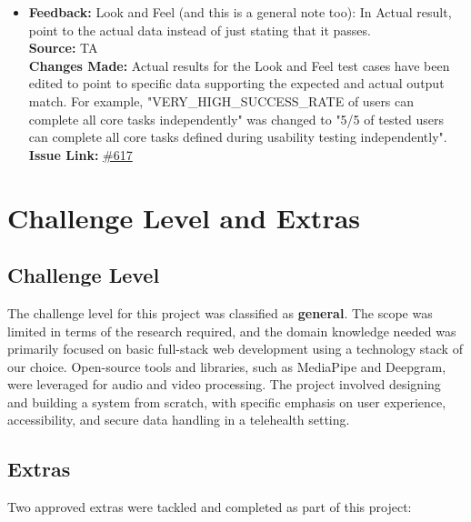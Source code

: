 \documentclass{article}
\begin{document}
\begin{itemize}
  \item 
    \textbf{Feedback:} Look and Feel (and this is a general note too): In Actual result, point to the actual data instead of just stating that it passes. \\
    \textbf{Source:} TA \\
    \textbf{Changes Made:} Actual results for the Look and Feel test cases have been edited to point to specific data supporting the expected and actual output match. For example, "VERY\_HIGH\_SUCCESS\_RATE of users can complete all core tasks independently" was changed to "5/5 of tested users can complete all core tasks defined during usability testing independently".\\
    \textbf{Issue Link:} \href{https://github.com/parishanizam/TeleHealth/issues/617}{\#617}

\end{itemize}

\section{Challenge Level and Extras}

\subsection{Challenge Level}

\hspace{2em}The challenge level for this project was classified as \textbf{general}. The scope was limited in terms of the research required, and the domain knowledge needed was primarily focused on basic full-stack web development using a technology stack of our choice. 
Open-source tools and libraries, such as MediaPipe and Deepgram, were leveraged for audio and video processing. The project involved designing and building a system from scratch, with specific emphasis on user experience, accessibility, and secure data handling in a telehealth setting.

\subsection{Extras}

Two approved extras were tackled and completed as part of this project:
\end{document}
